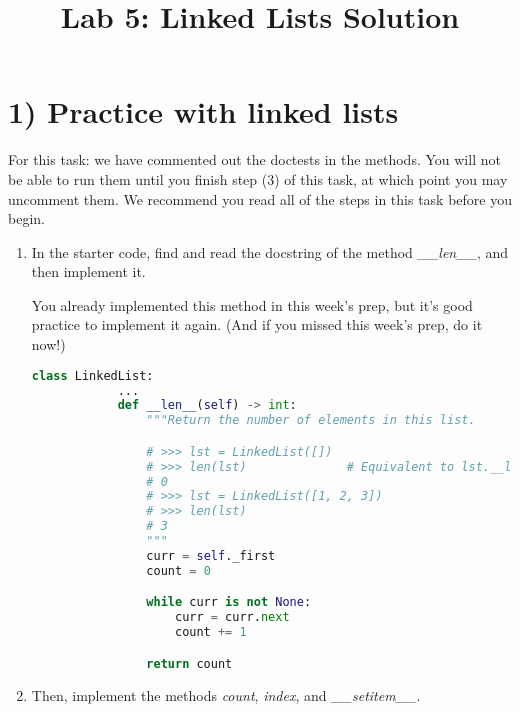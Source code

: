\documentclass[12pt]{article}
\begin{document}
\title{Lab 5: Linked Lists Solution}
\date{}
\maketitle

\section*{1) Practice with linked lists}

For this task: we have commented out the doctests in the methods. You will not
be able to run them until you finish step (3) of this task, at which point you
may uncomment them. We recommend you read all of the steps in this task before
you begin.

\bigskip

\begin{enumerate}[1.]
    \item
    In the starter code, find and read the docstring of the method \textit{\_\_len\_\_},
    and then implement it.

    \bigskip

    You already implemented this method in this week’s prep, but it’s good practice
    to implement it again. (And if you missed this week’s prep, do it now!)

    \begin{mdframed}
        \begin{lstlisting}[language=python,caption={task\_1\_step\_1\_solution.py}]
        class LinkedList:
            ...
            def __len__(self) -> int:
                """Return the number of elements in this list.

                # >>> lst = LinkedList([])
                # >>> len(lst)              # Equivalent to lst.__len__()
                # 0
                # >>> lst = LinkedList([1, 2, 3])
                # >>> len(lst)
                # 3
                """
                curr = self._first
                count = 0

                while curr is not None:
                    curr = curr.next
                    count += 1

                return count
        \end{lstlisting}
    \end{mdframed}

    \item Then, implement the methods \textit{count}, \textit{index}, and \textit{\_\_setitem\_\_}.


\end{enumerate}
\end{document}
